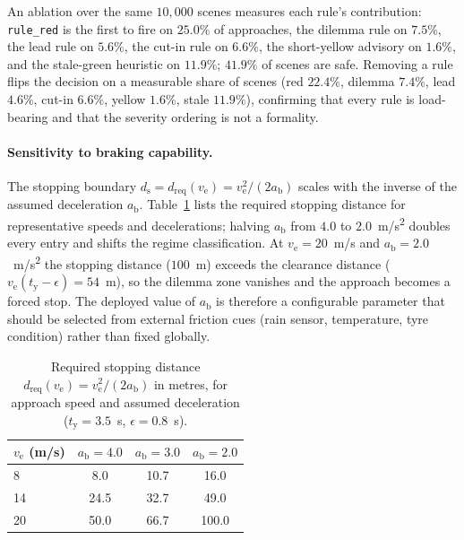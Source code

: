 \documentclass[conference, a4paper]{IEEEtran}
\theoremstyle{plain}
\newcommand{\dreq}{d_{\mathrm{req}}}
\newcommand{\ds}{d_{\mathrm{s}}}
\newcommand{\tred}{t_{\mathrm{y}}}
\newcommand{\ab}{a_{\mathrm{b}}}
\newcommand{\ve}{v_{\mathrm{e}}}
\begin{document}
An ablation over the same $10{,}000$ scenes measures each rule's
contribution: \texttt{rule\_red} is the first to fire on $25.0\%$ of
approaches, the dilemma rule on $7.5\%$, the lead rule on $5.6\%$, the
cut-in rule on $6.6\%$, the short-yellow advisory on $1.6\%$, and the
stale-green heuristic on $11.9\%$; $41.9\%$ of scenes are safe. Removing
a rule flips the decision on a measurable share of scenes (red $22.4\%$,
dilemma $7.4\%$, lead $4.6\%$, cut-in $6.6\%$, yellow $1.6\%$, stale
$11.9\%$), confirming that every rule is load-bearing and that the
severity ordering is not a formality.

\paragraph{Sensitivity to braking capability.} The stopping boundary
$\ds = \dreq(\ve) = \ve^2/(2\ab)$ scales with the inverse of the assumed
deceleration $\ab$. Table~\ref{tab:sens} lists the required stopping
distance for representative speeds and decelerations; halving $\ab$ from
$4.0$ to $2.0$~\si{m/s^2} doubles every entry and shifts the regime
classification. At $\ve = 20$~m/s and $\ab = 2.0$~\si{m/s^2} the stopping
distance ($100$~m) exceeds the clearance distance ($\ve(\tred-\epsilon) =
54$~m), so the dilemma zone vanishes and the approach becomes a forced stop.
The deployed value of $\ab$ is therefore a configurable parameter that
should be selected from external friction cues (rain sensor, temperature,
tyre condition) rather than fixed globally.

\begin{table}[t]
\caption{Required stopping distance $\dreq(\ve) = \ve^2/(2\ab)$ in metres,
for approach speed and assumed deceleration ($\tred = 3.5$~s,
$\epsilon = 0.8$~s).}
\label{tab:sens}
\centering
\footnotesize
\begin{tabular}{@{}lccc@{}}
\toprule
$\ve$ (m/s) & $\ab = 4.0$ & $\ab = 3.0$ & $\ab = 2.0$ \\
\midrule
8  & 8.0  & 10.7 & 16.0 \\
14 & 24.5 & 32.7 & 49.0 \\
20 & 50.0 & 66.7 & 100.0 \\
\bottomrule
\end{tabular}
\end{table}
\end{document}
